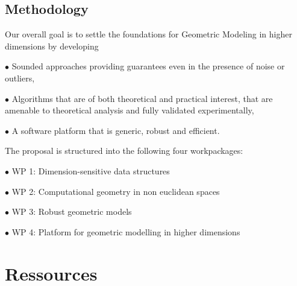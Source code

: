 





\subsection{Methodology}

Our overall goal is to settle the foundations for Geometric Modeling in higher dimensions by
developing 

\sind $\bullet$ Sounded approaches providing guarantees even in the presence of noise or outliers,


\sind $\bullet$  Algorithms that are of both theoretical and practical interest, that are amenable to theoretical analysis and fully validated experimentally,

\sind $\bullet$ A software platform that is generic, robust and efficient.

The proposal is structured into the following four workpackages:


\sind $\bullet$  {WP 1:  Dimension-sensitive data  structures} 


\sind $\bullet$  {WP 2:  Computational geometry in non euclidean spaces}


\sind $\bullet$  {WP 3: Robust geometric models}


\sind $\bullet$  {WP 4:  Platform for geometric modelling in higher dimensions} 











\section{Ressources}


